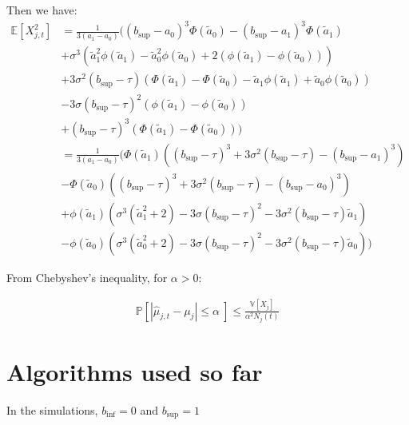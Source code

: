 \documentclass[11pt]{article}
\begin{document}
Then we have:
\begin{align*}
  \mathbb{E}[X_{j,t}^2] &= \frac{1}{3(a_1 - a_0)}\biggl( (b_{\sup}-a_0)^3 \Phi\left(\tilde{a}_0\right) - (b_{\sup}-a_1)^3 \Phi\left(\tilde{a}_1\right)\\
 & + \sigma^3 \left( \tilde{a}_1^2 \phi(\tilde{a}_1) -\tilde{a}_0^2 \phi(\tilde{a}_0) + 2 \left( \phi\left(\tilde{a}_1\right) - \phi\left(\tilde{a}_0\right)\right) \right)\\
 & + 3 \sigma^2 (b_{\sup}- \tau) \left( \Phi\left(\tilde{a}_1\right) -  \Phi\left(\tilde{a}_0\right) - \tilde{a}_1 \phi\left(\tilde{a}_1\right) + \tilde{a}_0 \phi\left(\tilde{a}_0\right)\right)\\
 & - 3 \sigma (b_{\sup}- \tau)^2 \left( \phi\left(\tilde{a}_1\right) - \phi\left(\tilde{a}_0\right)\right)\\
 & +  (b_{\sup}- \tau)^3 \left(\Phi\left(\tilde{a}_1\right) - \Phi\left(\tilde{a}_0\right) \right)\biggr)\\
 & = \frac{1}{3(a_1 - a_0)}\biggl(\Phi\left(\tilde{a}_1\right) \left( (b_{\sup}- \tau)^3 +3 \sigma^2 (b_{\sup}- \tau) - (b_{\sup}-a_1)^3\right)\\
 & - \Phi\left(\tilde{a}_0\right) \left( (b_{\sup}- \tau)^3 +3 \sigma^2 (b_{\sup}- \tau) - (b_{\sup}-a_0)^3\right) \\
 & + \phi\left(\tilde{a}_1\right)\left( \sigma^3 \left(\tilde{a}_1^2 + 2 \right) - 3 \sigma (b_{\sup}- \tau)^2 - 3 \sigma^2 (b_{\sup}- \tau)\tilde{a}_1  \right) \\
 & - \phi\left(\tilde{a}_0\right)\left( \sigma^3 \left(\tilde{a}_0^2 + 2 \right) - 3 \sigma (b_{\sup}- \tau)^2 - 3 \sigma^2 (b_{\sup}- \tau)\tilde{a}_0  \right) \biggr)
\end{align*}

From Chebyshev's inequality, for $\alpha > 0$:

\begin{align*}
  \mathbb{P}\left[\left|\hat{\mu}_{j,t} -\mu_j\right| \leq \alpha \ \right] \leq \frac{\mathbb{V}\left[X_j\right]}{\alpha^2 N_j(t)}
\end{align*}




\section{Algorithms used so far}

In the simulations, $b_{\inf} = 0$ and $b_{\sup} = 1$
\end{document}
